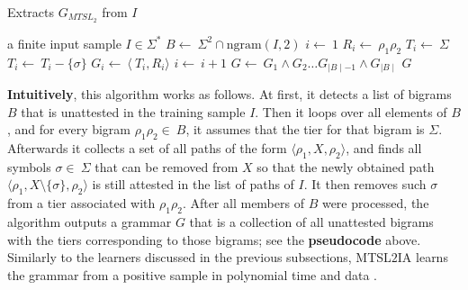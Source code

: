 \begin{algorithm}[h!]
\caption{Extracts $G_{MTSL_{2}}$ from $I$}
\begin{algorithmic}
\REQUIRE a finite input sample $I \in \Sigma^*$
\STATE $B \leftarrow~ \Sigma^2 \cap \textrm{ngram}(I, 2)$
\STATE $i \leftarrow~ 1$
	\STATE $R_i \leftarrow~ \rho_1\rho_2$
	\STATE $T_i \leftarrow~ \Sigma$
			\STATE $T_i \leftarrow~ T_i - \{\sigma\}$
		\ENDIF
	\ENDFOR
	\STATE $G_i \leftarrow~ \langle~ T_i, R_i \rangle$
	\STATE $i \leftarrow~ i+1$
\ENDFOR
\STATE $G \leftarrow~ G_1 \wedge G_2 \dots G_{\mid B\mid -1} \wedge G_{\mid B\mid}$
\RETURN $G$
\end{algorithmic}
\end{algorithm}

\textbf{Intuitively}, this algorithm works as follows.
At first, it detects a list of bigrams $B$ that is unattested in the training sample $I$.
Then it loops over all elements of $B$, and for every bigram $\rho_1\rho_2 \in~ B$, it assumes that the tier for that bigram is $\Sigma$.
Afterwards it collects a set of all paths of the form $\langle\rho_1, X, \rho_2\rangle$, and finds all symbols $\sigma \in~ \Sigma$ that can be removed from $X$ so that the newly obtained path $\langle\rho_1, X\setminus\{\sigma\}, \rho_2\rangle$ is still attested in the list of paths of $I$.
It then removes such $\sigma$ from a tier associated with $\rho_1\rho_2$.
After all members of $B$ were processed, the algorithm outputs a grammar $G$ that is a collection of all unattested bigrams with the tiers corresponding to those bigrams; see the \textbf{pseudocode} above.
Similarly to the learners discussed in the previous subsections, MTSL$2$IA learns the grammar from a positive sample in polynomial time and data \citep{McMullinAksenovaDeSanto2019}.

